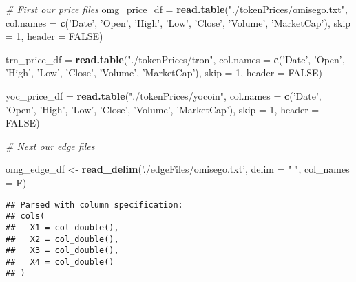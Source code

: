 \documentclass[]{article}
\newenvironment{Shaded}{\begin{snugshade}}{\end{snugshade}}
\newcommand{\KeywordTok}[1]{\textcolor[rgb]{0.13,0.29,0.53}{\textbf{#1}}}
\newcommand{\DataTypeTok}[1]{\textcolor[rgb]{0.13,0.29,0.53}{#1}}
\newcommand{\DecValTok}[1]{\textcolor[rgb]{0.00,0.00,0.81}{#1}}
\newcommand{\StringTok}[1]{\textcolor[rgb]{0.31,0.60,0.02}{#1}}
\newcommand{\CommentTok}[1]{\textcolor[rgb]{0.56,0.35,0.01}{\textit{#1}}}
\newcommand{\OtherTok}[1]{\textcolor[rgb]{0.56,0.35,0.01}{#1}}
\newcommand{\NormalTok}[1]{#1}
\begin{document}
\begin{Shaded}
\begin{Highlighting}[]
\CommentTok{# First our price files}
\NormalTok{omg_price_df =}\StringTok{ }\KeywordTok{read.table}\NormalTok{(}\StringTok{"./tokenPrices/omisego.txt"}\NormalTok{,}
                 \DataTypeTok{col.names =} \KeywordTok{c}\NormalTok{(}\StringTok{'Date'}\NormalTok{,  }\StringTok{'Open'}\NormalTok{, }\StringTok{'High'}\NormalTok{, }\StringTok{'Low'}\NormalTok{,  }\StringTok{'Close'}\NormalTok{,    }\StringTok{'Volume'}\NormalTok{,   }\StringTok{'MarketCap'}\NormalTok{),}
                 \DataTypeTok{skip =} \DecValTok{1}\NormalTok{,}
                 \DataTypeTok{header =} \OtherTok{FALSE}\NormalTok{)}

\NormalTok{trn_price_df =}\StringTok{ }\KeywordTok{read.table}\NormalTok{(}\StringTok{"./tokenPrices/tron"}\NormalTok{,}
                 \DataTypeTok{col.names =} \KeywordTok{c}\NormalTok{(}\StringTok{'Date'}\NormalTok{,  }\StringTok{'Open'}\NormalTok{, }\StringTok{'High'}\NormalTok{, }\StringTok{'Low'}\NormalTok{,  }\StringTok{'Close'}\NormalTok{,    }\StringTok{'Volume'}\NormalTok{,   }\StringTok{'MarketCap'}\NormalTok{),}
                 \DataTypeTok{skip =} \DecValTok{1}\NormalTok{,}
                 \DataTypeTok{header =} \OtherTok{FALSE}\NormalTok{)}

\NormalTok{yoc_price_df =}\StringTok{ }\KeywordTok{read.table}\NormalTok{(}\StringTok{"./tokenPrices/yocoin"}\NormalTok{,}
                 \DataTypeTok{col.names =} \KeywordTok{c}\NormalTok{(}\StringTok{'Date'}\NormalTok{,  }\StringTok{'Open'}\NormalTok{, }\StringTok{'High'}\NormalTok{, }\StringTok{'Low'}\NormalTok{,  }\StringTok{'Close'}\NormalTok{,    }\StringTok{'Volume'}\NormalTok{,   }\StringTok{'MarketCap'}\NormalTok{),}
                 \DataTypeTok{skip =} \DecValTok{1}\NormalTok{,}
                 \DataTypeTok{header =} \OtherTok{FALSE}\NormalTok{)}

\CommentTok{# Next our edge files}

\NormalTok{omg_edge_df <-}\StringTok{ }\KeywordTok{read_delim}\NormalTok{(}\StringTok{'./edgeFiles/omisego.txt'}\NormalTok{, }\DataTypeTok{delim =} \StringTok{" "}\NormalTok{, }\DataTypeTok{col_names =}\NormalTok{ F)}
\end{Highlighting}
\end{Shaded}

\begin{verbatim}
## Parsed with column specification:
## cols(
##   X1 = col_double(),
##   X2 = col_double(),
##   X3 = col_double(),
##   X4 = col_double()
## )
\end{verbatim}
\end{document}
